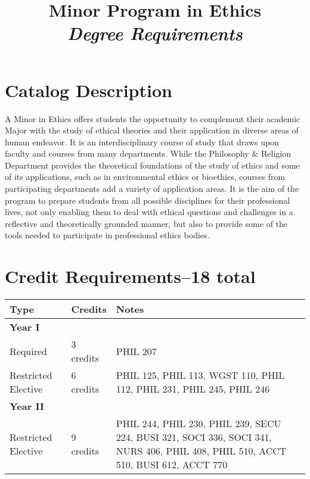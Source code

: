 \documentclass[oneside]{article}
\renewcommand{\rmdefault}{ppl}
\renewcommand{\rmdefault}{ppl}
\begin{document}
\renewcommand*\rmdefault{ppl}\normalfont\upshape

\title{Minor Program in Ethics \\ \emph{Degree Requirements} }
\maketitle

\section*{Catalog Description}
A Minor in Ethics offers students the opportunity to complement their academic Major with the study of ethical theories and their application in diverse areas of human endeavor. It is an interdisciplinary course of study that draws upon faculty and courses from many departments. While the Philosophy \& Religion Department provides the theoretical foundations of the study of ethics and some of its applications, such as in environmental ethics or bioethics, courses from participating departments add a variety of application areas. It is the aim of the program to prepare students from all possible disciplines for their professional lives, not only enabling them to deal with ethical questions and challenges in a reflective and theoretically grounded manner, but also to provide some of the tools needed to participate in professional ethics bodies.
\section*{Credit Requirements--18 total}

\begin{center}
    \begin{tabular}{ | l | p{4cm}| p{4cm} |}
    \hline
     Type & Credits  & Notes \\ \hline
     \textbf{Year I} & & \\ \hline
Required & 3 credits &  PHIL 207  \\ \hline
Restricted Elective & 6 credits &   PHIL 125, PHIL 113, WGST  110, PHIL 112, PHIL 231, PHIL 245, PHIL 246 \\ \hline 
\textbf{Year II} & & \\ \hline
Restricted Elective & 9 credits & PHIL 244,  PHIL 230, PHIL 239, SECU 224, BUSI 321, SOCI 336, SOCI 341, NURS 406, PHIL 408, PHIL 510, ACCT 510, BUSI 612, ACCT 770 \\ \hline
\end{tabular}
\end{center}
\end{document}
